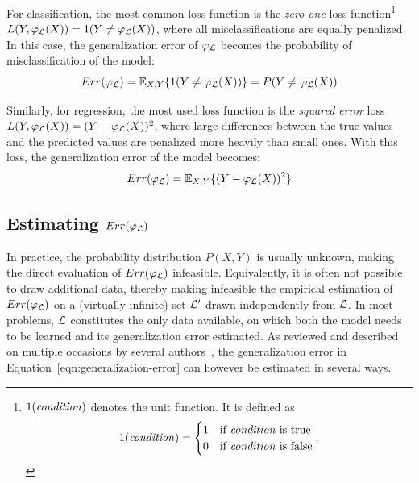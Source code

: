 For classification, the most common loss function is the \textit{zero-one} loss
function\footnote{$1(\text{\textit{condition}})$ denotes the unit function. It
is defined as
$$1(\text{\textit{condition}}) =
\begin{cases}
1 & \text{if \textit{condition} is true}\\
0 & \text{if \textit{condition} is false}
\end{cases}.
$$} $L(Y, \varphi_{\cal L}(X)) = 1(Y \neq \varphi_{\cal L}(X))$, where all
misclassifications are equally penalized. In this case, the generalization
error of $\varphi_{\cal L}$ becomes the probability of misclassification of the model:
\begin{equation}
Err(\varphi_{\cal L}) = \mathbb{E}_{X, Y}\{ 1(Y \neq \varphi_{\cal L}(X)) \} = P(Y \neq \varphi_{\cal L}(X))
\end{equation}

Similarly, for regression, the most used loss function is the \textit{squared
error} loss $L(Y, \varphi_{\cal L}(X)) = (Y - \varphi_{\cal L}(X))^2$, where large differences
between the true values and the predicted values are penalized more heavily
than small ones. With this loss, the generalization error of the model becomes:
\begin{equation}
Err(\varphi_{\cal L}) = \mathbb{E}_{X, Y}\{ (Y - \varphi_{\cal L}(X))^2  \}
\end{equation}

\subsection{Estimating $Err(\varphi_{\cal L})$}
\label{sec:2:estimating-generalization-error}

In practice, the probability distribution $P(X, Y)$ is usually unknown, making
the direct evaluation of $Err(\varphi_{\cal L})$ infeasible. Equivalently, it
is often not possible to draw additional data, thereby making infeasible the
empirical estimation of $Err(\varphi_{\cal L})$ on a (virtually infinite) set
${\cal L}'$ drawn independently from ${\cal L}$. In most problems, ${\cal L}$
constitutes the only data available, on which both the model needs to be
learned and its generalization error estimated. As reviewed and described on
multiple occasions by several
authors~\citep{toussaint:1974,stone:1978,breiman:1984,kohavi:1995,nadeau:2003,hastie:2005,arlot:2010},
the generalization error in Equation~\ref{eqn:generalization-error} can however
be estimated in several ways.

